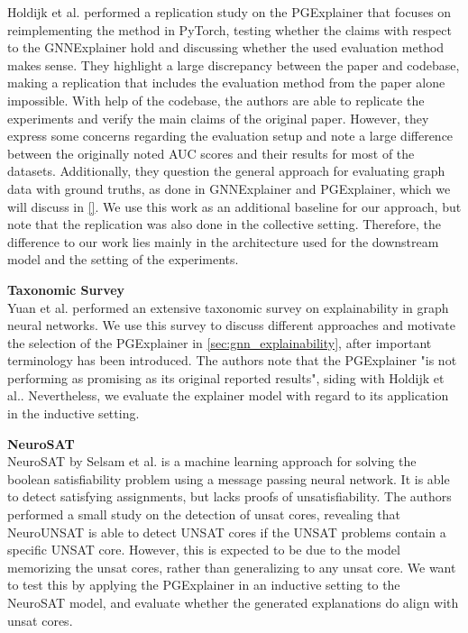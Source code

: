 Holdijk et al.\cite{holdijk2021re} performed a replication study on the PGExplainer that focuses on reimplementing the method in PyTorch, testing whether the claims with respect to the GNNExplainer hold and discussing whether the used evaluation method makes sense. They highlight a large discrepancy between the paper and codebase, making a replication that includes the evaluation method from the paper alone impossible. With help of the codebase, the authors are able to replicate the experiments and verify the main claims of the original paper. However, they express some concerns regarding the evaluation setup and note a large difference between the originally noted AUC scores and their results for most of the datasets. Additionally, they question the general approach for evaluating graph data with ground truths, as done in GNNExplainer and PGExplainer, which we will discuss in \ref{}. We use this work as an additional baseline for our approach, but note that the replication was also done in the collective setting. Therefore, the difference to our work lies mainly in the architecture used for the downstream model and the setting of the experiments. \bigskip

\textbf{Taxonomic Survey} \\
Yuan et al.\cite{yuan2022explainability} performed an extensive taxonomic survey on explainability in graph neural networks. We use this survey to discuss different approaches and motivate the selection of the PGExplainer in \ref{sec:gnn_explainability}, after important terminology has been introduced. The authors note that the PGExplainer "is not performing as promising as its original reported results"\cite{yuan2022explainability}, siding with Holdijk et al.\cite{holdijk2021re}. Nevertheless, we evaluate the explainer model with regard to its application in the inductive setting. \bigskip


\textbf{NeuroSAT} \\
NeuroSAT by Selsam et al.\cite{selsam2018learning} is a machine learning approach for solving the boolean satisfiability problem using a message passing neural network. It is able to detect satisfying assignments, but lacks proofs of unsatisfiability. The authors performed a small study on the detection of unsat cores, revealing that NeuroUNSAT is able to detect UNSAT cores if the UNSAT problems contain a specific UNSAT core. However, this is expected to be due to the model memorizing the unsat cores, rather than generalizing to any unsat core. We want to test this by applying the PGExplainer in an inductive setting to the NeuroSAT model, and evaluate whether the generated explanations do align with unsat cores.